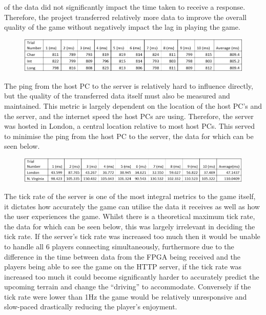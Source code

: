 \documentclass[12pt,a4paper]{article}
\begin{document}
{ of the data did not significantly impact the time taken to receive a response. 
 Therefore, the project transferred relatively more data to improve the overall 
 quality of the game without negatively impact the lag in playing the game. 
 \par
 \begin{figure} [h!]
    \centering
    \includegraphics[scale = 0.5]{Type.png}
 \end{figure}
 \par
 The ping from the host PC to the server is relatively hard to influence directly, 
 but the quality of the transferred data itself must also be measured and maintained. 
 This metric is largely dependent on the location of the host PC’s and the server, 
 and the internet speed the host PCs are using. Therefore, the server was hosted in 
 London, a central location relative to most host PCs. This served to minimise the 
 ping from the host PC to the server, the data for which can be seen below.}
 \begin{figure} [h!]
    \centering
    \includegraphics[scale = 0.5]{Ping.png}
 \end{figure}
 {\scriptsize The tick rate of the server is one of the most integral metrics to the game itself, 
 it dictates how accurately the game can utilise the data it receives as well as how 
 the user experiences the game. Whilst there is a theoretical maximum tick rate, the 
 data for which can be seen below, this was largely irrelevant in deciding the tick 
 rate. If the server’s tick rate was increased too much then it would be unable to 
 handle all 6 players connecting simultaneously, furthermore due to the difference 
 in the time between data from the FPGA being received and the players being able to 
 see the game on the HTTP server, if the tick rate was increased too much it could 
 become significantly harder to accurately predict the upcoming terrain and change 
 the “driving” to accommodate. Conversely if the tick rate were lower than 1Hz the 
 game would be relatively unresponsive and slow-paced drastically reducing the 
 player’s enjoyment.}
 \par
\end{document}
